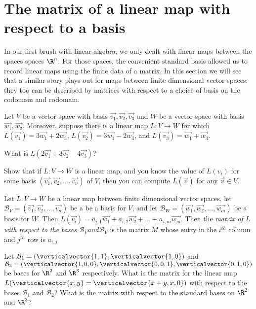 
\section{The matrix of a linear map with respect to a basis}
In our first brush with linear algebra, we only dealt with linear maps between the spaces spaces $\R^n$.  For those spaces, the convenient 
standard basis allowed us to record linear maps using the finite data of a matrix.  In this section we will see that a similar story plays out for
maps between finite dimensional vector spaces:  they too can be described by matrices with respect to a choice of basis on the codomain and codomain.

\begin{question}
	Let $V$ be a vector space with basis $\vec{v_1},\vec{v_2},\vec{v_3}$ and $W$ be a vector space with basis $\vec{w_1},\vec{w_2}$.
	Moreover, suppose there is a linear map $L: V \to W$ for which $L(\vec{v_1}) = 3\vec{w_1} + 2\vec{w_3}$, 
	$L(\vec{v_2}) = 3\vec{w_1} - 2\vec{w_3}$, and $L(\vec{v_3}) = \vec{w_1} + \vec{w_3}$.
	
	What is $L(2\vec{v_1}+3\vec{v_2}-4\vec{v_3})$?
\end{question}

\begin{question}
	Show that if $L:V \to W$ is a linear map, and you know the value of $L(v_i)$ for some basis $(\vec{v_1},\vec{v_2},...,\vec{v_n})$ of $V$, 
	then you can compute $L(\vec{v})$ for any $\vec{v} \in V$.
\end{question}

\begin{definition}
	Let $L:V \to W$ be a linear map between finite dimensional vector spaces,  let $\mathcal{B}_V  =(\vec{v_1},\vec{v_2},...,\vec{v_n}) $ be a be
	a basis for $V$, and let $\mathcal{B}_W = (\vec{w_1},\vec{w_2},...,\vec{w_m})$  be a basis for $W$.  
	Then $L(\vec{v_i}) = a_{i,1}\vec{w_1}+a_{i,2}\vec{w_2} +...+ a_{i,m}\vec{w_m}$.
	Then the \textit{matrix of $L$ with respect to the bases
	$\mathcal{B}_V and \mathcal{B}_V$} is the matrix $M$ whose entry in the $i^{th}$ column and $j^{th}$ row is $a_{i,j}$
\end{definition}

\begin{problem}
	Let $\mathcal{B}_1 = (\verticalvector{1,1},\verticalvector{1,0})$ and $\mathcal{B}_2 = (\verticalvector{1,0,0},\verticalvector{0,0,1},\verticalvector{0,1,0})$ be bases
	for $\R^2$ and $\R^3$ respectively.  What is the matrix for the linear map $L(\verticalvector{x,y} = \verticalvector{x+y,x,0})$ with respect to the 
	bases $\mathcal{B}_1$  and $\mathcal{B}_2$?  What is the matrix with respect to the standard bases on $\R^2$ and $\R^3$?
\end{problem}

